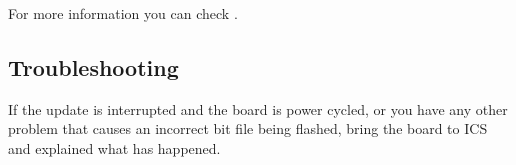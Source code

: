 \documentclass[11pt
  , a4paper
  , article
  , oneside
  , showtrims
]{memoir}
\begin{document}
For more information you can check \citep{MRFKERNELDRIVER}.

\subsection{Troubleshooting}
If the update is interrupted and the board is power cycled, or you have any other problem that causes an incorrect bit file being flashed, bring the board to ICS and explained what has happened.










\clearpage

\backmatter
%
%
%

%
%

\end{document}
